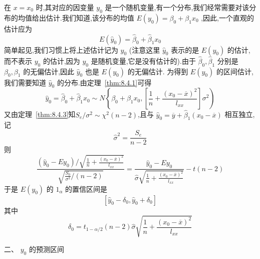 在 $ x=x_0 $ 时,其对应的因变量 $ y_0 $ 是一个随机变量,有一个分布,我们经常需要对该分布的均值给出估计.我们知道,该分布的均值 $ E(y_0)=\beta_0+\beta_1x_0 $ ,因此,一个直观的估计应为
\[
E(\widehat{y}_0)=\widehat{\beta }_0+\widehat{\beta }_1x_0
\]
简单起见,我们习惯上将上述估计记为 $ \hat{y}_0 $ (注意这里 $ \hat{y}_0 $ 表示的是 $ E(y_0) $ 的估计,而不表示 $ y_0 $ 的估计,因为 $ y_0 $ 是随机变量,它是没有估计的).由于 $ \hat{\beta}_0,\hat{\beta}_1 $ 分别是 $ \beta_0,\beta_1 $ 的无偏估计,因此 $ \hat{y}_0 $ 也是 $ E(y_0) $ 的无偏估计.
为得到 $ E(y_0) $ 的区间估计,我们需要知道 $ \hat{y}_0 $ 的分布.由定理~\ref{thm:8.4.1}可得
\[
\hat{y}_{0}=\hat{\beta}_{0}+\hat{\beta}_{1} x_{0} \sim N\left\{\beta_{0}+\beta_{1} x_{0},\left[\frac{1}{n}+\frac{\left(x_{0}-\overline{x}\right)^{2}}{l_{x x}}\right] \sigma^{2}\right)
\]
又由定理~\ref{thm:8.4.3}知$S_{e} / \sigma^{2} \sim \chi^{2}(n-2)$,且与 $\hat{y}_{0}=\overline{y}+\hat{\beta}_{1}\left(x_{0}-\overline{x}\right)$ 相互独立,记
\[
\hat{\sigma}^2=\frac{S_e}{n-2}	
\]
则
\[
\frac{\left(\hat{y}_{0}-E y_{0}\right) / \sqrt{\frac{1}{n}+\frac{\left(x_{0}-\overline{x}\right)^{2}}{l_{x x}}}}{\sqrt{\frac{S_{0}}{\sigma^{2}} /(n-2)}}=\frac{\hat{y}_{0}-E y_{0}}{\hat{\sigma} \sqrt{\frac{1}{n}+\frac{\left(x_{0}-\overline{x}\right)^{2}}{l_{x x}}}}-t(n-2)
\]
于是 $ E(y_0) $ 的 $ 1_\alpha $ 的置信区间是
\begin{equation}
\left[ \widehat{y}_0-\delta _0,\widehat{y}_0+\delta _0 \right] \label{eq:8.4.20}
\end{equation}
其中
\begin{equation}
\delta_{0}=t_{1-\alpha / 2}(n-2) \hat{\sigma} \sqrt{\frac{1}{n}+\frac{\left(x_{0}-\overline{x}\right)^{2}}{l_{x x}}}\label{eq:8.4.21}
\end{equation}

二、 $ y_0 $ 的预测区间

